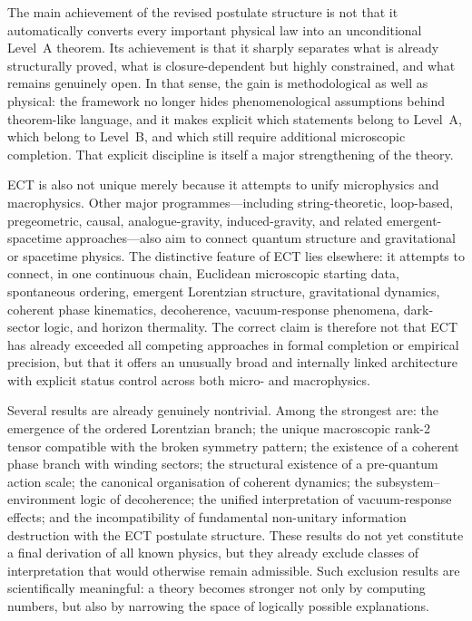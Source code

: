 \documentclass[11pt,a4paper]{article}
\numberwithin{equation}{section}
\begin{document}
The main achievement of the revised postulate structure is not that it
automatically converts every important physical law into an
unconditional Level~A theorem.
Its achievement is that it sharply separates what is already
structurally proved, what is closure-dependent but highly constrained,
and what remains genuinely open.
In that sense, the gain is methodological as well as physical:
the framework no longer hides phenomenological assumptions behind
theorem-like language, and it makes explicit which statements belong to
Level~A, which belong to Level~B, and which still require additional
microscopic completion.
That explicit discipline is itself a major strengthening of the theory.

ECT is also not unique merely because it attempts to unify
microphysics and macrophysics.
Other major programmes---including string-theoretic, loop-based,
pregeometric, causal, analogue-gravity, induced-gravity, and related
emergent-spacetime approaches---also aim to connect quantum structure
and gravitational or spacetime physics.
The distinctive feature of ECT lies elsewhere:
it attempts to connect, in one continuous chain, Euclidean microscopic
starting data, spontaneous ordering, emergent Lorentzian structure,
gravitational dynamics, coherent phase kinematics, decoherence,
vacuum-response phenomena, dark-sector logic, and horizon thermality.
The correct claim is therefore not that ECT has already exceeded all
competing approaches in formal completion or empirical precision, but
that it offers an unusually broad and internally linked architecture
with explicit status control across both micro- and macrophysics.

Several results are already genuinely nontrivial.
Among the strongest are:
the emergence of the ordered Lorentzian branch;
the unique macroscopic rank-2 tensor compatible with the broken
symmetry pattern;
the existence of a coherent phase branch with winding sectors;
the structural existence of a pre-quantum action scale;
the canonical organisation of coherent dynamics;
the subsystem--environment logic of decoherence;
the unified interpretation of vacuum-response effects;
and the incompatibility of fundamental non-unitary information
destruction with the ECT postulate structure.
These results do not yet constitute a final derivation of all known
physics, but they already exclude classes of interpretation that would
otherwise remain admissible.
Such exclusion results are scientifically meaningful:
a theory becomes stronger not only by computing numbers, but also by
narrowing the space of logically possible explanations.
\end{document}
